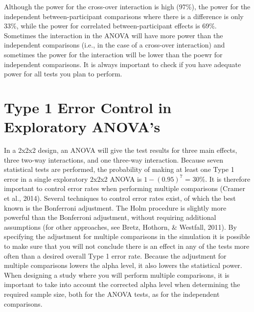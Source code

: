 \documentclass[,jou, draftfirst, a4paper,floatsintext]{apa6}
\begin{document}
Although the power for the cross-over interaction is high (97\%), the power for the independent between-participant comparisons where there is a difference is only 33\%, while the power for correlated between-participant effects is 69\%.
Sometimes the interaction in the ANOVA will have more power than the independent comparisons (i.e., in the case of a cross-over interaction) and sometimes the power for the interaction will be lower than the poewr for independent comparisons.
It is always important to check if you have adequate power for all tests you plan to perform.

\hypertarget{type-1-error-control-in-exploratory-anovas}{%
\section{Type 1 Error Control in Exploratory ANOVA's}\label{type-1-error-control-in-exploratory-anovas}}

In a 2x2x2 design, an ANOVA will give the test results for three main effects, three two-way interactions, and one three-way interaction.
Because seven statistical tests are performed, the probability of making at least one Type 1 error in a single exploratory 2x2x2 ANOVA is \(1-(0.95)^7\) = 30\%.
It is therefore important to control error rates when performing multiple comparisons (Cramer et al., 2014).
Several techniques to control error rates exist, of which the best known is the Bonferroni adjustment.
The Holm procedure is slightly more powerful than the Bonferroni adjustment, without requiring additional assumptions (for other approaches, see Bretz, Hothorn, \& Westfall, 2011).
By specifying the adjustment for multiple comparisons in the simulation it is possible to make sure that you will not conclude there is an effect in any of the tests more often than a desired overall Type 1 error rate.
Because the adjustment for multiple comparisons lowers the alpha level, it also lowers the statistical power.
When designing a study where you will perform multiple comparisons, it is important to take into account the corrected alpha level when determining the required sample size, both for the ANOVA tests, as for the independent comparisons.
\end{document}
